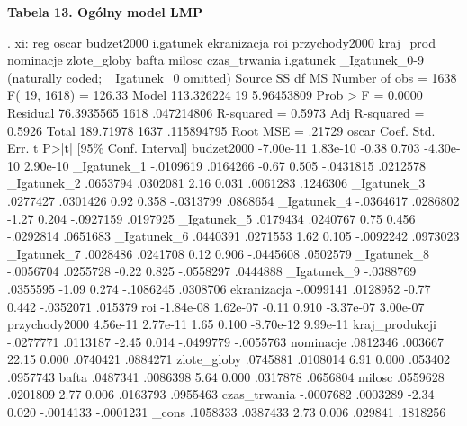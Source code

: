\textbf{Tabela 13. Ogólny model LMP}
\begin{stlog}	
. xi: reg oscar  budzet2000 i.gatunek ekranizacja roi przychody2000 kraj_prod nominacje zlote_globy bafta
 milosc czas_trwania
i.gatunek         _Igatunek_0-9       (naturally coded; _Igatunek_0 omitted)
{\smallskip}
      Source {\VBAR}       SS       df       MS              Number of obs =    1638
           F( 19,  1618) =  126.33
       Model {\VBAR}  113.326224    19  5.96453809           Prob > F      =  0.0000
    Residual {\VBAR}  76.3935565  1618  .047214806           R-squared     =  0.5973
           Adj R-squared =  0.5926
       Total {\VBAR}   189.71978  1637  .115894795           Root MSE      =  .21729
{\smallskip}
         oscar {\VBAR}      Coef.   Std. Err.      t    P>|t|     [95\% Conf. Interval]
    budzet2000 {\VBAR}  -7.00e-11   1.83e-10    -0.38   0.703    -4.30e-10    2.90e-10
   _Igatunek_1 {\VBAR}  -.0109619   .0164266    -0.67   0.505    -.0431815    .0212578
   _Igatunek_2 {\VBAR}   .0653794   .0302081     2.16   0.031     .0061283    .1246306
   _Igatunek_3 {\VBAR}   .0277427   .0301426     0.92   0.358    -.0313799    .0868654
   _Igatunek_4 {\VBAR}  -.0364617   .0286802    -1.27   0.204    -.0927159    .0197925
   _Igatunek_5 {\VBAR}   .0179434   .0240767     0.75   0.456    -.0292814    .0651683
   _Igatunek_6 {\VBAR}   .0440391   .0271553     1.62   0.105    -.0092242    .0973023
   _Igatunek_7 {\VBAR}   .0028486   .0241708     0.12   0.906    -.0445608    .0502579
   _Igatunek_8 {\VBAR}  -.0056704   .0255728    -0.22   0.825    -.0558297    .0444888
   _Igatunek_9 {\VBAR}  -.0388769   .0355595    -1.09   0.274    -.1086245    .0308706
   ekranizacja {\VBAR}  -.0099141   .0128952    -0.77   0.442    -.0352071     .015379
           roi {\VBAR}  -1.84e-08   1.62e-07    -0.11   0.910    -3.37e-07    3.00e-07
 przychody2000 {\VBAR}   4.56e-11   2.77e-11     1.65   0.100    -8.70e-12    9.99e-11
kraj_produkcji {\VBAR}  -.0277771   .0113187    -2.45   0.014    -.0499779   -.0055763
     nominacje {\VBAR}   .0812346    .003667    22.15   0.000     .0740421    .0884271
   zlote_globy {\VBAR}   .0745881   .0108014     6.91   0.000      .053402    .0957743
         bafta {\VBAR}   .0487341   .0086398     5.64   0.000     .0317878    .0656804
        milosc {\VBAR}   .0559628   .0201809     2.77   0.006     .0163793    .0955463
  czas_trwania {\VBAR}  -.0007682   .0003289    -2.34   0.020    -.0014133   -.0001231
         _cons {\VBAR}   .1058333   .0387433     2.73   0.006      .029841    .1818256

\end{stlog}

